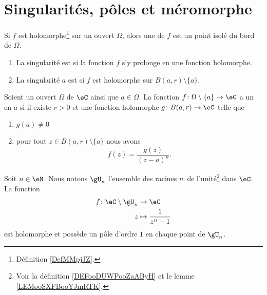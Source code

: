 
\section{Singularités, pôles et méromorphe}

\begin{definition}      \label{DEFooKWDUooVPvtpy}
	Si \( f\) est holomorphe\footnote{Définition \ref{DefMMpjJZ}.} sur un ouvert \( \Omega\), alors une  de \( f\) est un point isolé du bord de \( \Omega\).

	\begin{enumerate}
		\item
		      La singularité est  si la fonction \( f\) s'y prolonge en une fonction holomorphe.
		\item
		      La singularité \( a\) est  si \( f\) est holomorphe sur \( B(a,r)\setminus\{ a \}\).
	\end{enumerate}
\end{definition}


\begin{definition}    \label{DEFooUIJTooUJPiDG}
	Soient un ouvert \( \Omega\) de \( \eC\) ainsi que \( a\in \Omega\). La fonction \( f\colon \Omega\setminus\{ a \}\to \eC\) a un  en \( a\) si il existe \( r>0\) et une fonction holomorphe $g\colon B(a,r)\to \eC$ telle que
	\begin{enumerate}
		\item
		      \( g(a)\neq 0\)
		\item
		      pour tout \( z\in B(a,r)\setminus\{ a \}\) nous avons
		      \begin{equation}
			      f(z)=\frac{ g(z) }{ (z-a)^n }.
		      \end{equation}
	\end{enumerate}
\end{definition}

\begin{lemma}
	Soit \( n\in \eN\). Nous notons \( \gU_n\) l'ensemble des racines \( n\)\ieme\ de l'unité\footnote{Voir la définition \ref{DEFooDUWPooZaAByH} et le lemme \ref{LEMooSXFBooYJmRTK}.} dans \( \eC\). La fonction
	\begin{equation}
		\begin{aligned}
			f\colon \eC\setminus\gU_n & \to \eC                   \\
			z                         & \mapsto \frac{1}{ z^n-1 }
		\end{aligned}
	\end{equation}
	est holomorphe et possède un pôle d'ordre \( 1\) en chaque point de \( \gU_n\).
\end{lemma}

